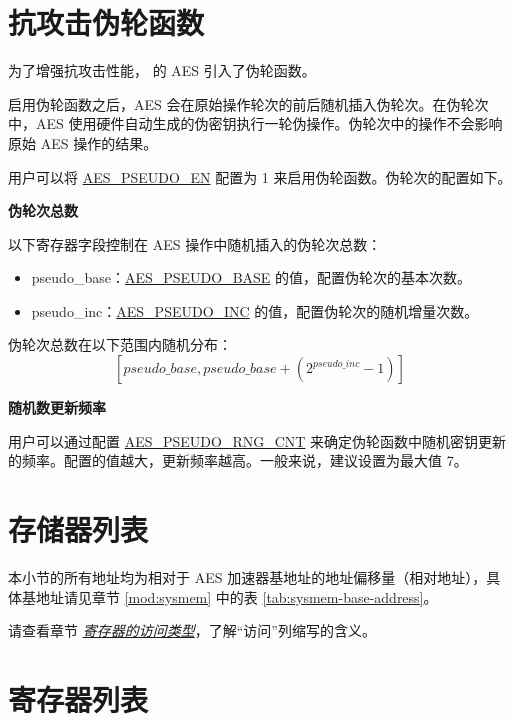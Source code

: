 \documentclass[main\_\_CN.tex]{subfiles}
\begin{document}
\section{抗攻击伪轮函数}\label{aes-pseudo-round}

为了增强抗攻击性能，\chipname{} 的 AES 引入了伪轮函数。

启用伪轮函数之后，AES 会在原始操作轮次的前后随机插入伪轮次。在伪轮次中，AES 使用硬件自动生成的伪密钥执行一轮伪操作。伪轮次中的操作不会影响原始 AES 操作的结果。

用户可以将 \hyperref[fielddesc:AESPSEUDOEN]{AES\_PSEUDO\_EN} 配置为 1 来启用伪轮函数。伪轮次的配置如下。

\textbf{伪轮次总数}

以下寄存器字段控制在 AES 操作中随机插入的伪轮次总数：
\begin{itemize}
    \item pseudo\_base：\hyperref[fielddesc:AESPSEUDOBASE]{AES\_PSEUDO\_BASE} 的值，配置伪轮次的基本次数。
    \item pseudo\_inc：\hyperref[fielddesc:AESPSEUDOINC]{AES\_PSEUDO\_INC} 的值，配置伪轮次的随机增量次数。
\end{itemize}

伪轮次总数在以下范围内随机分布：$$[pseudo\_base,pseudo\_base+(2^{pseudo\_inc}-1)]$$

\textbf{随机数更新频率}

用户可以通过配置 \hyperref[fielddesc:AESPSEUDORNGCNT]{AES\_PSEUDO\_RNG\_CNT} 来确定伪轮函数中随机密钥更新的频率。配置的值越大，更新频率越高。一般来说，建议设置为最大值 7。


\clearpage
\section{存储器列表}

本小节的所有地址均为相对于 AES 加速器基地址的地址偏移量（相对地址），具体基地址请见章节 \ref{mod:sysmem} \textit{} 中的表 \ref{tab:sysmem-base-address}。

请查看章节 \hyperref[glossary-access-types]{\textit{寄存器的访问类型}}，了解“访问”列缩写的含义。



\newpage

\hypertarget{aes-reg-summ}{}
\section{寄存器列表}
\end{document}
